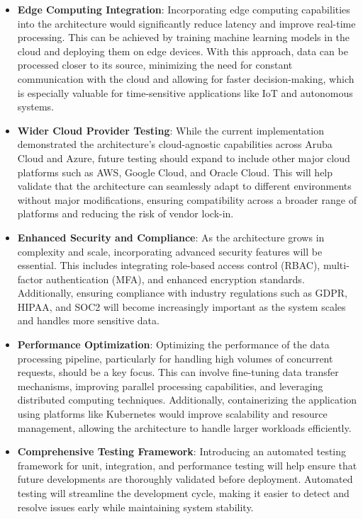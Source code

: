 \begin{itemize}
    \item \textbf{Edge Computing Integration}: Incorporating edge computing capabilities into the architecture would significantly reduce latency and improve real-time processing. This can be achieved by training machine learning models in the cloud and deploying them on edge devices. With this approach, data can be processed closer to its source, minimizing the need for constant communication with the cloud and allowing for faster decision-making, which is especially valuable for time-sensitive applications like IoT and autonomous systems.
    
    \item \textbf{Wider Cloud Provider Testing}: While the current implementation demonstrated the architecture’s cloud-agnostic capabilities across Aruba Cloud and Azure, future testing should expand to include other major cloud platforms such as AWS, Google Cloud, and Oracle Cloud. This will help validate that the architecture can seamlessly adapt to different environments without major modifications, ensuring compatibility across a broader range of platforms and reducing the risk of vendor lock-in.

 \item \textbf{Enhanced Security and Compliance}: As the architecture grows in complexity and scale, incorporating advanced security features will be essential. This includes integrating role-based access control (RBAC), multi-factor authentication (MFA), and enhanced encryption standards. Additionally, ensuring compliance with industry regulations such as GDPR\cite{site:gdpr}, HIPAA\cite{site:hipaa}, and SOC2\cite{site:soc2} will become increasingly important as the system scales and handles more sensitive data.


    \item \textbf{Performance Optimization}: Optimizing the performance of the data processing pipeline, particularly for handling high volumes of concurrent requests, should be a key focus. This can involve fine-tuning data transfer mechanisms, improving parallel processing capabilities, and leveraging distributed computing techniques. Additionally, containerizing the application using platforms like Kubernetes would improve scalability and resource management, allowing the architecture to handle larger workloads efficiently.

    \item \textbf{Comprehensive Testing Framework}: Introducing an automated testing framework for unit, integration, and performance testing will help ensure that future developments are thoroughly validated before deployment. Automated testing will streamline the development cycle, making it easier to detect and resolve issues early while maintaining system stability.
\end{itemize}


